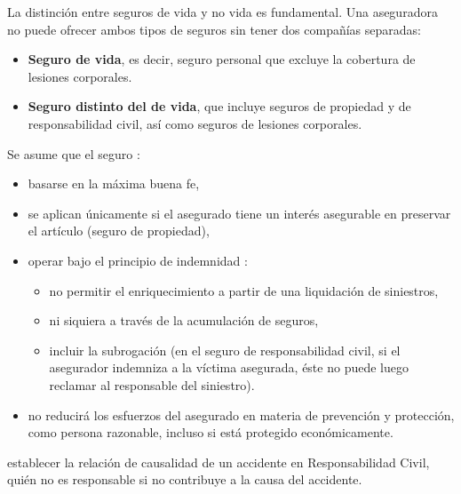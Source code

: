 \begin{f}
	
La distinción entre seguros de vida y no vida es fundamental. Una aseguradora no puede ofrecer ambos tipos de seguros sin tener dos compañías separadas: 
\begin{itemize}
	\item \textbf{Seguro de vida}, es decir, seguro personal que excluye la cobertura de lesiones corporales.
	\item \textbf{Seguro distinto del de vida}, que incluye seguros de propiedad y de responsabilidad civil, así como seguros de lesiones corporales.
\end{itemize}
\end{f}


\begin{f}
	
	
Se asume que el seguro :
	\begin{itemize}
		\item basarse en la máxima buena fe,
		\item se aplican únicamente si el asegurado tiene un interés asegurable en preservar el artículo (seguro de propiedad),
		\item operar bajo el principio de indemnidad : 
		\begin{itemize}
			\item no permitir el enriquecimiento a partir de una liquidación de siniestros,
			\item ni siquiera a través de la acumulación de seguros, 
			\item incluir la subrogación (en el seguro de responsabilidad civil, si el asegurador indemniza a la víctima asegurada, éste no puede luego reclamar al responsable del siniestro). 
		\end{itemize}
		\item no reducirá los esfuerzos del asegurado en materia de prevención y protección, como persona razonable, incluso si está protegido económicamente.
	\end{itemize}
	\item establecer la relación de causalidad de un accidente en Responsabilidad Civil, quién no es responsable si no contribuye a la causa del accidente.
\end{f}


